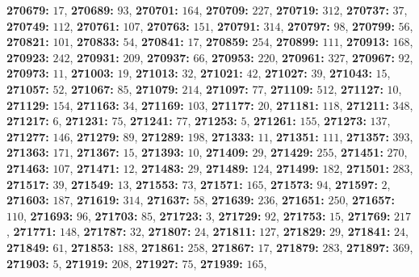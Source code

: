 \textsf{\bfseries 270679:} $17$, \textsf{\bfseries 270689:} $93$, \textsf{\bfseries 270701:} $164$, \textsf{\bfseries 270709:} $227$, \textsf{\bfseries 270719:} $312$, \textsf{\bfseries 270737:} $37$, \textsf{\bfseries 270749:} $112$, \textsf{\bfseries 270761:} $107$, \textsf{\bfseries 270763:} $151$, \textsf{\bfseries 270791:} $314$, \textsf{\bfseries 270797:} $98$, \textsf{\bfseries 270799:} $56$, \textsf{\bfseries 270821:} $101$, \textsf{\bfseries 270833:} $54$, \textsf{\bfseries 270841:} $17$, \textsf{\bfseries 270859:} $254$, \textsf{\bfseries 270899:} $111$, \textsf{\bfseries 270913:} $168$, \textsf{\bfseries 270923:} $242$, \textsf{\bfseries 270931:} $209$, \textsf{\bfseries 270937:} $66$, \textsf{\bfseries 270953:} $220$, \textsf{\bfseries 270961:} $327$, \textsf{\bfseries 270967:} $92$, \textsf{\bfseries 270973:} $11$, \textsf{\bfseries 271003:} $19$, \textsf{\bfseries 271013:} $32$, \textsf{\bfseries 271021:} $42$, \textsf{\bfseries 271027:} $39$, \textsf{\bfseries 271043:} $15$, \textsf{\bfseries 271057:} $52$, \textsf{\bfseries 271067:} $85$, \textsf{\bfseries 271079:} $214$, \textsf{\bfseries 271097:} $77$, \textsf{\bfseries 271109:} $512$, \textsf{\bfseries 271127:} $10$, \textsf{\bfseries 271129:} $154$, \textsf{\bfseries 271163:} $34$, \textsf{\bfseries 271169:} $103$, \textsf{\bfseries 271177:} $20$, \textsf{\bfseries 271181:} $118$, \textsf{\bfseries 271211:} $348$, \textsf{\bfseries 271217:} $6$, \textsf{\bfseries 271231:} $75$, \textsf{\bfseries 271241:} $77$, \textsf{\bfseries 271253:} $5$, \textsf{\bfseries 271261:} $155$, \textsf{\bfseries 271273:} $137$, \textsf{\bfseries 271277:} $146$, \textsf{\bfseries 271279:} $89$, \textsf{\bfseries 271289:} $198$, \textsf{\bfseries 271333:} $11$, \textsf{\bfseries 271351:} $111$, \textsf{\bfseries 271357:} $393$, \textsf{\bfseries 271363:} $171$, \textsf{\bfseries 271367:} $15$, \textsf{\bfseries 271393:} $10$, \textsf{\bfseries 271409:} $29$, \textsf{\bfseries 271429:} $255$, \textsf{\bfseries 271451:} $270$, \textsf{\bfseries 271463:} $107$, \textsf{\bfseries 271471:} $12$, \textsf{\bfseries 271483:} $29$, \textsf{\bfseries 271489:} $124$, \textsf{\bfseries 271499:} $182$, \textsf{\bfseries 271501:} $283$, \textsf{\bfseries 271517:} $39$, \textsf{\bfseries 271549:} $13$, \textsf{\bfseries 271553:} $73$, \textsf{\bfseries 271571:} $165$, \textsf{\bfseries 271573:} $94$, \textsf{\bfseries 271597:} $2$, \textsf{\bfseries 271603:} $187$, \textsf{\bfseries 271619:} $314$, \textsf{\bfseries 271637:} $58$, \textsf{\bfseries 271639:} $236$, \textsf{\bfseries 271651:} $250$, \textsf{\bfseries 271657:} $110$, \textsf{\bfseries 271693:} $96$, \textsf{\bfseries 271703:} $85$, \textsf{\bfseries 271723:} $3$, \textsf{\bfseries 271729:} $92$, \textsf{\bfseries 271753:} $15$, \textsf{\bfseries 271769:} $217$, \textsf{\bfseries 271771:} $148$, \textsf{\bfseries 271787:} $32$, \textsf{\bfseries 271807:} $24$, \textsf{\bfseries 271811:} $127$, \textsf{\bfseries 271829:} $29$, \textsf{\bfseries 271841:} $24$, \textsf{\bfseries 271849:} $61$, \textsf{\bfseries 271853:} $188$, \textsf{\bfseries 271861:} $258$, \textsf{\bfseries 271867:} $17$, \textsf{\bfseries 271879:} $283$, \textsf{\bfseries 271897:} $369$, \textsf{\bfseries 271903:} $5$, \textsf{\bfseries 271919:} $208$, \textsf{\bfseries 271927:} $75$, \textsf{\bfseries 271939:} $165$, 

